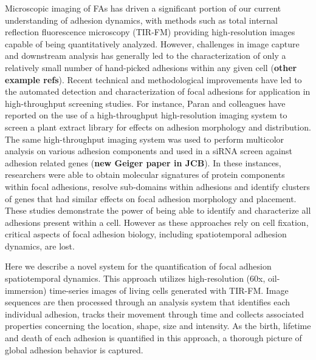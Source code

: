 \documentclass[10pt]{article}
\begin{document}
Microscopic imaging of FAs has driven a significant portion of our current
understanding of adhesion dynamics, with methods such as total internal
reflection fluorescence microscopy (TIR-FM) providing high-resolution images
capable of being quantitatively analyzed. However, challenges in image capture
and downstream analysis has generally led to the characterization of only a
relatively small number of hand-picked adhesions within any given cell
\cite{Webb2004} (\textbf{other example refs}). Recent technical and
methodological improvements have led to the automated detection and
characterization of focal adhesions for application in high-throughput screening
studies. For instance, Paran and colleagues have reported on the use of a
high-throughput high-resolution imaging system to screen a plant extract library
for effects on adhesion morphology and distribution. The same high-throughput
imaging system was used to perform multicolor analysis on various adhesion
components \cite{Zamir2008} and used in a siRNA screen against adhesion related
genes (\textbf{new Geiger paper in JCB}). In these instances, researchers were
able to obtain molecular signatures of protein components within focal
adhesions, resolve sub-domains within adhesions and identify clusters of genes
that had similar effects on focal adhesion morphology and placement. These
studies demonstrate the power of being able to identify and characterize all
adhesions present within a cell. However as these approaches rely on cell
fixation, critical aspects of focal adhesion biology, including spatiotemporal
adhesion dynamics, are lost.

Here we describe a novel system for the quantification of focal adhesion
spatiotemporal dynamics. This approach utilizes high-resolution (60x,
oil-immersion) time-series images of living cells generated with TIR-FM. Image
sequences are then processed through an analysis system that identifies each
individual adhesion, tracks their movement through time and collects associated
properties concerning the location, shape, size and intensity. As the birth,
lifetime and death of each adhesion is quantified in this approach, a thorough
picture of global adhesion behavior is captured.
\end{document}

